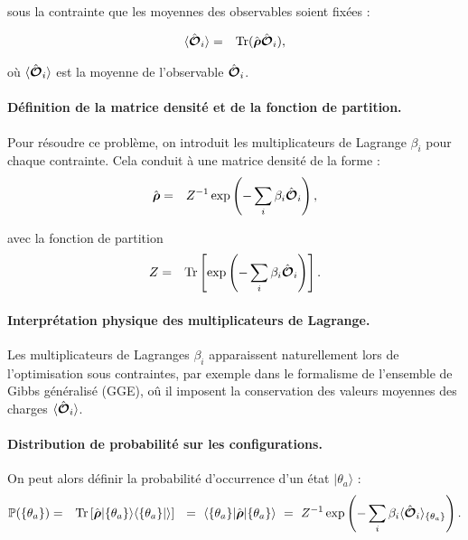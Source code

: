 sous la contrainte que les moyennes des observables soient fixées :

\begin{eqnarray}
	\langle \hat{\bm{\mathcal{O}}}_i \rangle & = & 	\mathrm{Tr} ( \hat{\bm{\rho}} \hat{\bm{\mathcal{O}}}_i ) ,
\end{eqnarray}

où $\langle \hat{\bm{\mathcal{O}}}_i \rangle$ est la moyenne de l'observable $\hat{\bm{\mathcal{O}}}_i$.

\paragraph{Définition de la matrice densité et de la fonction de partition.}
Pour résoudre ce problème, on introduit les multiplicateurs de Lagrange $\beta_i$ pour chaque contrainte. Cela conduit à une matrice densité de la forme : 
\begin{eqnarray}
	 \hat{\bm{\rho}} &= & Z^{-1} \exp \left ( - \sum_i \beta_i \hat{\bm{\mathcal{O}}}_i \right ) , 		
\end{eqnarray}

avec la fonction de partition 
\begin{eqnarray}
	Z & = & \mathrm{Tr} \left [ \exp \left ( - \sum_i \beta_i \hat{\bm{\mathcal{O}}}_i \right ) \right ]. 	
\end{eqnarray}
 \paragraph{Interprétation physique des multiplicateurs de Lagrange.}
Les multiplicateurs de Lagranges $\beta_i$ apparaissent naturellement lors de l'optimisation sous contraintes, par exemple dans le formalisme de l'ensemble de Gibbs généralisé (GGE), oû il imposent la conservation des valeurs moyennes des charges $\langle \hat{\bm{\mathcal{O}}}_i \rangle $.

\paragraph{Distribution de probabilité sur les configurations.}
On peut alors définir la probabilité d’occurrence d’un état $\vert { \theta_a } \rangle$ :
\begin{eqnarray}
	\mathbb{P} ( \{ \theta_a \} ) & = & \mathrm{Tr} \left [\operator{\rho} \vert \{ \theta_a \} \rangle \langle \{ \theta_a \} \vert \rangle \right ] ~=~  \langle \{ \theta_a \} \vert	\operator{\rho} \vert \{ \theta_a \} \rangle ~=~ Z^{-1} \exp \left (- \sum_i \beta_i \langle\operator{\mathcal{O}}_i\rangle_{\{\theta_a\}} \right ) .
\end{eqnarray}

